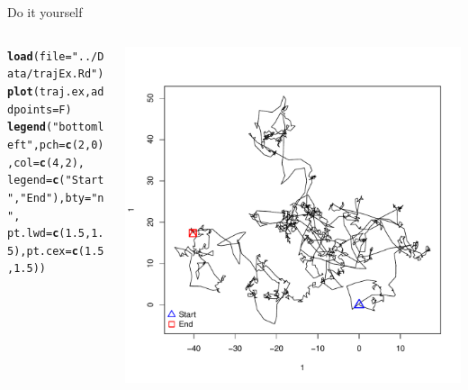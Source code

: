 \documentclass{beamer}\usepackage[]{graphicx}\usepackage[]{color}
\makeatletter
\newcommand{\hlnum}[1]{\textcolor[rgb]{0.686,0.059,0.569}{#1}}%
\newcommand{\hlstr}[1]{\textcolor[rgb]{0.192,0.494,0.8}{#1}}%
\newcommand{\hlstd}[1]{\textcolor[rgb]{0.345,0.345,0.345}{#1}}%
\newcommand{\hlkwc}[1]{\textcolor[rgb]{0.333,0.667,0.333}{#1}}%
\newcommand{\hlkwd}[1]{\textcolor[rgb]{0.737,0.353,0.396}{\textbf{#1}}}%
\newenvironment{kframe}{%
 \def\at@end@of@kframe{}%
 \ifinner\ifhmode%
  \def\at@end@of@kframe{\end{minipage}}%
  \begin{minipage}{\columnwidth}%
 \fi\fi%
 \def\FrameCommand##1{\hskip\@totalleftmargin \hskip-\fboxsep
 \colorbox{shadecolor}{##1}\hskip-\fboxsep
     \hskip-\linewidth \hskip-\@totalleftmargin \hskip\columnwidth}%
 \MakeFramed {\advance\hsize-\width
   \@totalleftmargin\z@ \linewidth\hsize
   \@setminipage}}%
 {\par\unskip\endMakeFramed%
 \at@end@of@kframe}
\newenvironment{knitrout}{}{} %
\makeatother
\begin{document}
%  
 \begin{frame}[fragile]{Do it yourself}

\begin{columns}
\begin{column}{0.4\textwidth}
\begin{knitrout}\tiny
{}\color{fgcolor}\begin{kframe}
\begin{alltt}
\hlkwd{load}\hlstd{(}\hlkwc{file}\hlstd{=}\hlstr{"../Data/trajEx.Rd"}\hlstd{)}
\hlkwd{plot}\hlstd{(traj.ex,} \hlkwc{addpoints} \hlstd{= F)}
\hlkwd{legend}\hlstd{(}\hlstr{"bottomleft"}\hlstd{,}\hlkwc{pch}\hlstd{=}\hlkwd{c}\hlstd{(}\hlnum{2}\hlstd{,} \hlnum{0}\hlstd{),} \hlkwc{col}\hlstd{=}\hlkwd{c}\hlstd{(}\hlnum{4}\hlstd{,}\hlnum{2}\hlstd{),}
       \hlkwc{legend}\hlstd{=}\hlkwd{c}\hlstd{(}\hlstr{"Start"}\hlstd{,} \hlstr{"End"}\hlstd{),} \hlkwc{bty} \hlstd{=} \hlstr{"n"}\hlstd{,}
       \hlkwc{pt.lwd} \hlstd{=} \hlkwd{c}\hlstd{(}\hlnum{1.5}\hlstd{,}\hlnum{1.5}\hlstd{),} \hlkwc{pt.cex} \hlstd{=} \hlkwd{c}\hlstd{(}\hlnum{1.5}\hlstd{,}\hlnum{1.5}\hlstd{))}
\end{alltt}
\end{kframe}
\end{knitrout}
\end{column}
\begin{column}{0.5\textwidth}
\includegraphics[scale=0.35]{Practical1-1.pdf}
\end{column}
\end{columns}
\end{frame}
\end{document}
